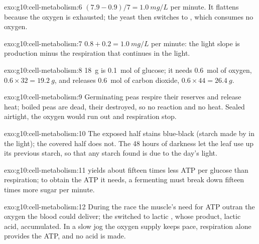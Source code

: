 \begin{solution}{exo:g10:cell-metabolism:6}
$(7.9 - 0.9)/7 = \qty{1.0}{mg/L}$ per minute. It flattens because
the oxygen is exhausted; the yeast then switches to ,
which consumes no oxygen.
\end{solution}

\begin{solution}{exo:g10:cell-metabolism:7}
$0.8 + 0.2 = \qty{1.0}{mg/L}$ per minute: the light slope is
production minus the respiration that continues in the light.
\end{solution}

\begin{solution}{exo:g10:cell-metabolism:8}
\qty{18}{g} is \qty{0.1}{mol} of glucose; it needs \qty{0.6}{mol} of
oxygen, $0.6 \times 32 = \qty{19.2}{g}$, and releases \qty{0.6}{mol}
of carbon dioxide, $0.6 \times 44 = \qty{26.4}{g}$.
\end{solution}

\begin{solution}{exo:g10:cell-metabolism:9}
Germinating peas respire their reserves and release heat; boiled peas
are dead, their  destroyed, so no reaction and no heat. Sealed
airtight, the oxygen would run out and respiration stop.
\end{solution}

\begin{solution}{exo:g10:cell-metabolism:10}
The exposed half stains blue-black (starch made by  in
the light); the covered half does not. The 48 hours of darkness let
the leaf use up its previous starch, so that any starch found is due
to the day's light.
\end{solution}

\begin{solution}{exo:g10:cell-metabolism:11}
 yields about fifteen times less ATP per glucose than
respiration; to obtain the ATP it needs, a fermenting  must break
down fifteen times more sugar per minute.
\end{solution}

\begin{solution}{exo:g10:cell-metabolism:12}
During the race the muscle's need for ATP outran the oxygen the blood
could deliver; the  switched to lactic , whose product,
lactic acid, accumulated. In a slow jog the oxygen supply keeps pace,
respiration alone provides the ATP, and no acid is made.
\end{solution}


